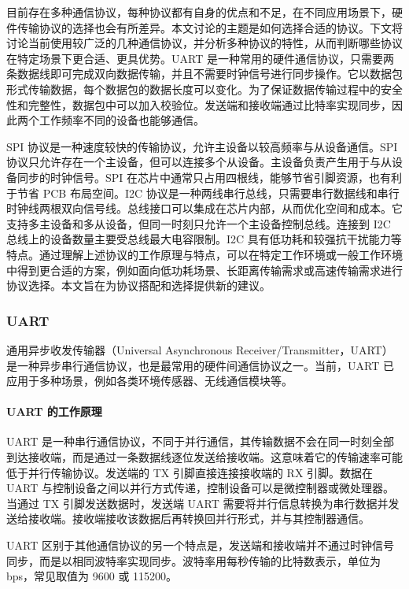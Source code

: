 \documentclass[12pt,a4paper]{article}
\numberwithin{equation}{section}
\begin{document}
目前存在多种通信协议，每种协议都有自身的优点和不足，在不同应用场景下，硬件传输协议的选择也会有所差异。本文讨论的主题是如何选择合适的协议。下文将讨论当前使用较广泛的几种通信协议，并分析多种协议的特性，从而判断哪些协议在特定场景下更合适、更具优势。UART 是一种常用的硬件通信协议，只需要两条数据线即可完成双向数据传输，并且不需要时钟信号进行同步操作。它以数据包形式传输数据，每个数据包的数据长度可以变化。为了保证数据传输过程中的安全性和完整性，数据包中可以加入校验位。发送端和接收端通过比特率实现同步，因此两个工作频率不同的设备也能够通信。

SPI 协议是一种速度较快的传输协议，允许主设备以较高频率与从设备通信。SPI 协议只允许存在一个主设备，但可以连接多个从设备。主设备负责产生用于与从设备同步的时钟信号。SPI 在芯片中通常只占用四根线，能够节省引脚资源，也有利于节省 PCB 布局空间。I2C 协议是一种两线串行总线，只需要串行数据线和串行时钟线两根双向信号线。总线接口可以集成在芯片内部，从而优化空间和成本。它支持多主设备和多从设备，但同一时刻只允许一个主设备控制总线。连接到 I2C 总线上的设备数量主要受总线最大电容限制。I2C 具有低功耗和较强抗干扰能力等特点。通过理解上述协议的工作原理与特点，可以在特定工作环境或一般工作环境中得到更合适的方案，例如面向低功耗场景、长距离传输需求或高速传输需求进行协议选择。本文旨在为协议搭配和选择提供新的建议。

\subsubsection*{UART}

通用异步收发传输器（Universal Asynchronous Receiver/Transmitter，UART）是一种异步串行通信协议，也是最常用的硬件间通信协议之一。当前，UART 已应用于多种场景，例如各类环境传感器、无线通信模块等。

\paragraph{UART 的工作原理}

UART 是一种串行通信协议，不同于并行通信，其传输数据不会在同一时刻全部到达接收端，而是通过一条数据线逐位发送给接收端。这意味着它的传输速率可能低于并行传输协议。发送端的 TX 引脚直接连接接收端的 RX 引脚。数据在 UART 与控制设备之间以并行方式传递，控制设备可以是微控制器或微处理器。当通过 TX 引脚发送数据时，发送端 UART 需要将并行信息转换为串行数据并发送给接收端。接收端接收该数据后再转换回并行形式，并与其控制器通信。

UART 区别于其他通信协议的另一个特点是，发送端和接收端并不通过时钟信号同步，而是以相同波特率实现同步。波特率用每秒传输的比特数表示，单位为 bps，常见取值为 9600 或 115200。
\end{document}
